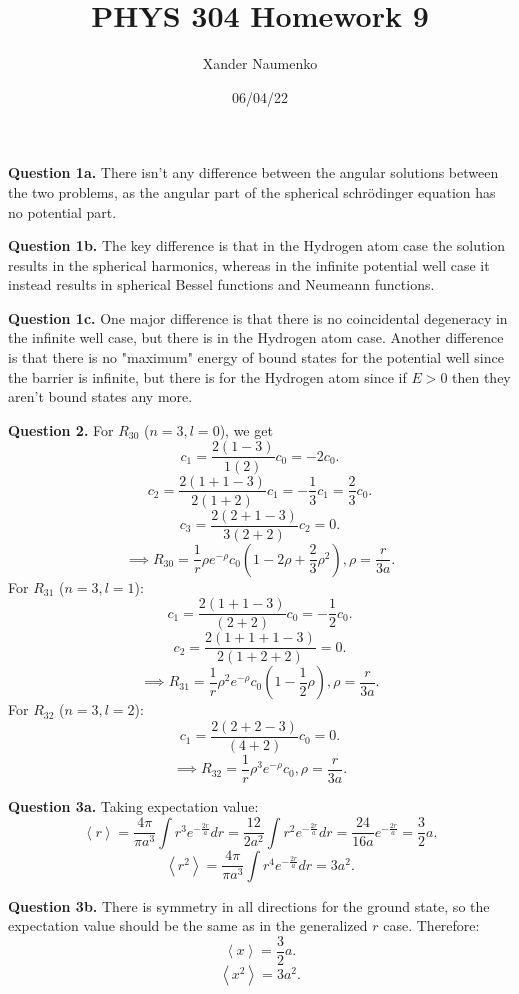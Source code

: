 \documentclass[letterpaper, reqno,11pt]{article}
\begin{document}
\title{PHYS 304 Homework 9}
\date{06/04/22}
\author{Xander Naumenko}
\maketitle

{\noindent\bf Question 1a.} There isn't any difference between the angular solutions between the two problems, as the angular part of the spherical schr\"odinger equation has no potential part. 

{\noindent\bf Question 1b.} The key difference is that in the Hydrogen atom case the solution results in the spherical harmonics, whereas in the infinite potential well case it instead results in spherical Bessel functions and Neumeann functions. 

{\noindent\bf Question 1c.} One major difference is that there is no coincidental degeneracy in the infinite well case, but there is in the Hydrogen atom case. Another difference is that there is no "maximum" energy of bound states for the potential well since the barrier is infinite, but there is for the Hydrogen atom since if $E>0$ then they aren't bound states any more. 

{\noindent\bf Question 2.} For $R_{30}$ ($n=3,l=0$), we get 
\[
c_1=\frac{2\left( 1-3 \right) }{1\left( 2 \right) }c_0=-2c_0
.\]
\[
c_2=\frac{2\left( 1+1-3 \right) }{2\left( 1+2 \right) }c_1=-\frac{1}{3}c_1=\frac{2}{3}c_0
.\]
\[
c_3=\frac{2(2+1-3)}{3\left( 2+2 \right) }c_2=0
.\]
\[
\implies R_{30}=\frac{1}{r}\rho e^{-\rho}c_0\left( 1-2\rho+\frac{2}{3}\rho^2 \right), \rho=\frac{r}{3a}
.\]
For $R_{31}$ ($n=3, l=1$):
\[
c_1=\frac{2\left( 1+1-3 \right) }{\left( 2+2 \right) }c_0=-\frac{1}{2}c_0
.\]
\[
c_2=\frac{2\left( 1+1+1-3 \right) }{2\left( 1+2+2 \right) }=0
.\]
\[
\implies R_{31}=\frac{1}{r}\rho^{2} e^{-\rho}c_0\left( 1-\frac{1}{2}\rho\right), \rho=\frac{r}{3a}
.\]
For $R_{32}$ ($n=3, l=2$):
\[
c_1=\frac{2\left( 2+2-3 \right) }{\left( 4+2 \right) }c_0=0
.\]
\[
\implies R_{32}=\frac{1}{r}\rho^{3} e^{-\rho}c_0, \rho=\frac{r}{3a}
.\]

{\noindent\bf Question 3a.} Taking expectation value: 
\[
\left<r \right>=\frac{4\pi}{\pi a^3 }\int r^{3} e^{-\frac{2r}{a}}dr=\frac{12}{2 a^2}\int r^2e^{-\frac{2r}{a}}dr=\frac{24}{16 a}e^{-\frac{2r}{a}}=\frac{3}{2}a
.\]
\[
\left<r^2 \right>=\frac{4\pi}{\pi a^3}\int r^{4}e^{-\frac{2r}{a}}dr=3a^2
.\]

{\noindent\bf Question 3b.} There is symmetry in all directions for the ground state, so the expectation value should be the same as in the generalized $r$ case. Therefore: 
\[
\left<x \right>=\frac{3}{2}a
.\]
\[
\left<x^2 \right>=3a^2
.\]
\end{document}
